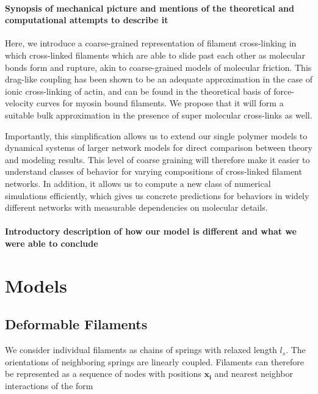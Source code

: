 \documentclass[10pt,letterpaper]{article}
\begin{document}
\paragraph{Synopsis of mechanical picture and mentions of the theoretical and computational attempts to describe it}

Here, we introduce a coarse-grained representation of filament cross-linking in which cross-linked filaments which are able to slide past each other as molecular bonds form and rupture, akin to coarse-grained models of molecular friction\cite{theo_friction,theo_frictionSam,theo_molefric}.  This drag-like coupling has been shown to be an adequate approximation in the case of ionic cross-linking of actin\cite{mol_fric,theo_hydroish2}, and can be found in the theoretical basis of force-velocity curves for myosin bound filaments\cite{theo_frictionShila}. We propose that it will form a suitable bulk approximation in the presence of super molecular cross-links as well.

Importantly, this simplification allows us to extend our single polymer models to dynamical systems of larger network models for direct comparison between theory and modeling results.  This level of coarse graining will therefore make it easier to understand classes of behavior for varying compositions of cross-linked filament networks.  In addition, it allows us to compute a new class of numerical simulations efficiently, which gives us concrete predictions for behaviors in widely different networks with measurable dependencies on molecular details.



\paragraph{Introductory description of how our model is different and what we were able to conclude}





\section*{Models}
\subsection*{Deformable Filaments}
We consider individual filaments as chains of springs with relaxed length $l_s$.  The orientations of neighboring springs are linearly coupled. Filaments can therefore be represented as a sequence of nodes with positions $\mathbf{x_i}$ and nearest neighbor interactions of the form
\end{document}
